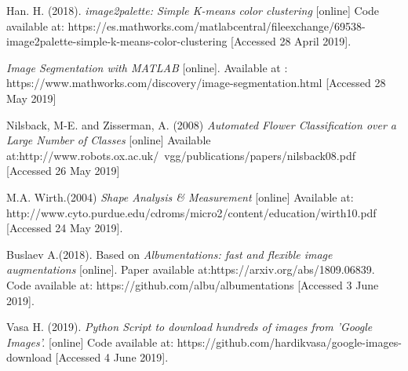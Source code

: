 \documentclass[11]{article}
\begin{document}
\newpage
\begin{thebibliography}{100}
	Han. H. (2018). \textit{image2palette: Simple K-means color clustering} [online] Code available at: https://es.mathworks.com/matlabcentral/fileexchange/69538-image2palette-simple-k-means-color-clustering [Accessed 28 April 2019].

\textit{Image Segmentation with MATLAB} [online]. Available at : https://www.mathworks.com/discovery/image-segmentation.html [Accessed 28 May 2019]

Nilsback, M-E. and Zisserman, A. (2008) \textit{Automated Flower Classification over a Large Number of Classes} [online] Available at:http://www.robots.ox.ac.uk/~vgg/publications/papers/nilsback08.pdf [Accessed 26 May 2019]


M.A. Wirth.(2004) \textit{Shape Analysis \& Measurement} [online] Available at: http://www.cyto.purdue.edu/cdroms/micro2/content/education/wirth10.pdf [Accessed 24 May 2019].

    Buslaev A.(2018). Based on \textit{Albumentations: fast and flexible image augmentations} [online]. Paper available at:https://arxiv.org/abs/1809.06839. Code available at: https://github.com/albu/albumentations  [Accessed 3 June 2019].


    Vasa H. (2019). \textit{Python Script to download hundreds of images from 'Google Images'.} [online] Code available at: https://github.com/hardikvasa/google-images-download [Accessed 4 June 2019].








\end{thebibliography}
\end{document}
